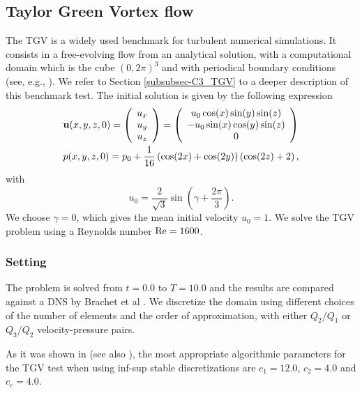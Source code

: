 \subsection{Taylor Green Vortex flow}
\label{subsec-C7_TGV-SRK}
The TGV is a widely used benchmark for turbulent numerical simulations. It consists in a free-evolving flow from an analytical solution, with a computational domain which is the cube $(0,2\pi)^3$ and with periodical boundary conditions (see, e.g., \cite{brachet_direct_1991}). We refer to Section \ref{subsubsec-C3_TGV} to a deeper description of this benchmark test. The initial solution is given by the following expression
\begin{align}
\label{eq-C7_ini_sol_TG}
&{\bf u}(x,y,z,0)=\left(\begin{array}{c}
u_x\\
u_y\\
u_z
\end{array}\right)=\left(\begin{array}{c}
u_0\cos(x)\sin(y)\sin(z)\\
-u_0\sin(x)\cos(y)\sin(z)\\
0
\end{array}\right)\\\nonumber
&p(x,y,z,0)=p_0+\frac{1}{16}\left(\cos(2x)+\cos(2y)\right)\left(\cos(2z)+2\right),
\end{align}
with
$$u_0=\frac{2}{\sqrt{3}}\sin\left(\gamma+\frac{2\pi}{3}\right).$$
We choose $\gamma=0$, which gives the mean initial velocity  $u_0=1$. We solve the TGV problem using a Reynolds number ${\rm Re}=1600$.

\subsubsection{Setting}
The problem is solved from $t=0.0$ to $T=10.0$ and the results are compared against a DNS by Brachet et al \cite{brachet_direct_1991}. We discretize the domain using different choices of the number of elements and the order of approximation, with either $ Q_2/Q_1 $ or $ Q_3/Q_2 $ velocity-pressure pairs.

As it was shown in \cite{colomes_mixed_2015} (see also ), the most appropriate algorithmic parameters for the TGV test when using inf-sup stable discretizations are $ c_1=12.0 $, $ c_2=4.0 $ and $ c_c=4.0 $.

